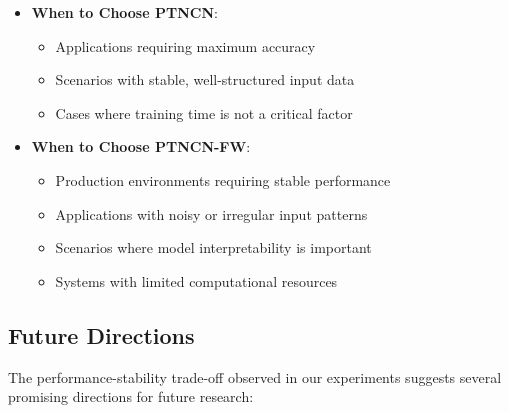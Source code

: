 \documentclass{article}
\begin{document}
\begin{itemize}
    \item \textbf{When to Choose PTNCN}:
    \begin{itemize}
        \item Applications requiring maximum accuracy
        \item Scenarios with stable, well-structured input data
        \item Cases where training time is not a critical factor
    \end{itemize}

    \item \textbf{When to Choose PTNCN-FW}:
    \begin{itemize}
        \item Production environments requiring stable performance
        \item Applications with noisy or irregular input patterns
        \item Scenarios where model interpretability is important
        \item Systems with limited computational resources
    \end{itemize}
\end{itemize}

\subsection{Future Directions}

The performance-stability trade-off observed in our experiments suggests several promising directions for future research:
\end{document}
